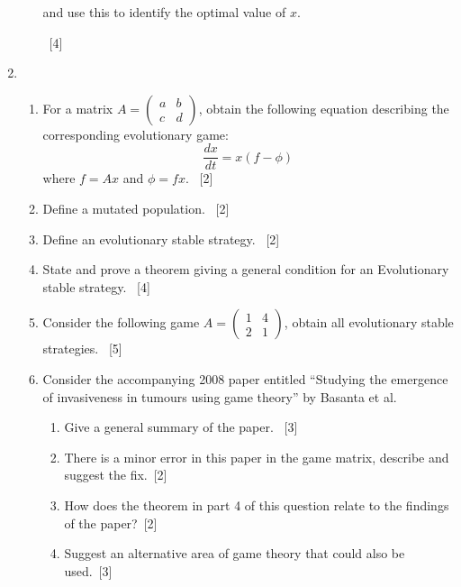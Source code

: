 \documentclass[12pt,a4paper]{article}
\begin{document}
\begin{enumerate}
\begin{enumerate}
            and use this to identify the optimal value of \(x\).

            ~\hfill{[4]}
    \end{enumerate}

\newpage
\item

    \begin{enumerate}
        \item For a matrix \(A=\begin{pmatrix}a&b\\c &d\end{pmatrix}\), obtain
              the following equation describing the corresponding evolutionary
              game:
              \[\frac{dx}{dt}=x(f-\phi)\]
              where \(f=Ax\) and \(\phi=fx\).
              ~\hfill{[2]}
        \item Define a mutated population.
              ~\hfill{[2]}
        \item Define an evolutionary stable strategy.
              ~\hfill{[2]}
        \item State and prove a theorem giving a general condition for an
            Evolutionary stable strategy.
              ~\hfill{[4]}
        \item Consider the following game
        \(A=\begin{pmatrix}1&4\\2 &1\end{pmatrix}\), obtain all evolutionary
            stable strategies.
              ~\hfill{[5]}
         \item Consider the accompanying 2008 paper entitled ``Studying the
             emergence of invasiveness in tumours using game theory'' by Basanta
             et al.
             \begin{enumerate}
                 \item Give a general summary of the paper.
                     ~\hfill{[3]}
                 \item There is a minor error in this paper in the game matrix, 
                     describe and suggest the fix.~\hfill{[2]}
                 \item How does the theorem in part 4 of this question relate to
                     the findings of the paper?~\hfill{[2]}
                 \item Suggest an alternative area of game theory that could
                     also be used.~\hfill{[3]}
             \end{enumerate}
    \end{enumerate}


\end{enumerate}
\end{document}
